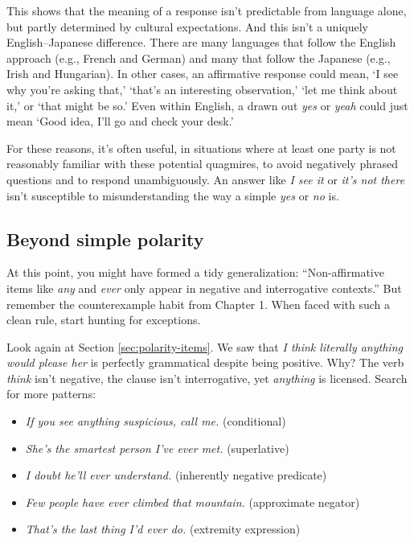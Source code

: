 This shows that the meaning of a response isn't predictable from language alone, but partly determined by cultural expectations. And this isn't a uniquely English--Japanese difference. There are many languages that follow the English approach (e.g., French and German) and many that follow the Japanese (e.g., Irish and Hungarian).
In other cases, an affirmative response could mean, `I see why you're asking that,' `that's an interesting observation,' `let me think about it,' or `that might be so.' Even within English, a drawn out \textit{yes} or \textit{yeah} could just mean `Good idea, I'll go and check your desk.'

For these reasons, it's often useful, in situations where at least one party is not reasonably familiar with these potential quagmires, to avoid negatively phrased questions and to respond unambiguously. An answer like \textit{I see it} or \textit{it's not there} isn't susceptible to misunderstanding the way a simple \textit{yes} or \textit{no} is.

\subsection{Beyond simple polarity}

At this point, you might have formed a tidy generalization: ``Non-affirmative items like \textit{any} and \textit{ever} only appear in negative and interrogative contexts.'' But remember the counterexample habit from Chapter 1. When faced with such a clean rule, start hunting for exceptions.

Look again at Section \ref{sec:polarity-items}. We saw that \textit{I think literally anything would please her} is perfectly grammatical despite being positive. Why? The verb \textit{think} isn't negative, the clause isn't interrogative, yet \textit{anything} is licensed. Search for more patterns:

\begin{itemize}[noitemsep]
   \item \textit{If you see anything suspicious, call me.} (conditional)
   \item \textit{She's the smartest person I've ever met.} (superlative)
   \item \textit{I doubt he'll ever understand.} (inherently negative predicate)
   \item \textit{Few people have ever climbed that mountain.} (approximate negator)
   \item \textit{That's the last thing I'd ever do.} (extremity expression)
\end{itemize}

